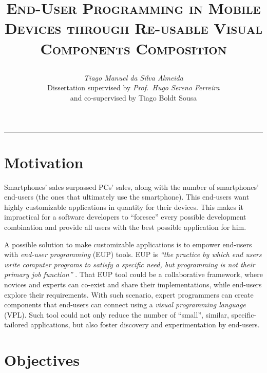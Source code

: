\documentclass[9pt,a4paper]{extarticle}
\begin{document}
\title{\vspace*{-8mm}\textbf{\textsc{End-User Programming in Mobile Devices
through Re-usable Visual Components Composition}}
\author{\emph{Tiago Manuel da Silva Almeida}\\[2mm]
\small{Dissertation supervised by \emph{Prof.\ Hugo Sereno Ferreira}}\\
\small{and co-supervised by Tiago Boldt Sousa}}}
\date{}
\maketitle
\thispagestyle{empty}

\vspace*{-4mm}\noindent\rule{\textwidth}{0.4pt}\vspace*{4mm}

\begin{multicols}{2}

\section{Motivation}\label{sec:motiva}

Smartphones' sales surpassed PCs' sales, along with the number of smartphones' end-users (the ones that ultimately use the smartphone). This end-users want highly customizable applications in quantity for their devices. 
This makes it impractical for a software developers to ``foresee'' every possible development combination and provide all users with the best possible application for him. 

A possible solution to make customizable applications is to empower end-users with \emph{end-user programming} (EUP) tools. 
EUP is \emph{``the practice by which end users write computer programs to satisfy a specific need, but programming is not their primary job function''} \cite{EUSEReport}.
That EUP tool could be a collaborative framework, where novices and experts can co-exist and share their implementations, while end-users explore their requirements. With such scenario, expert programmers can create components that end-users can connect using a \emph{visual programming language} (VPL). Such tool could not only reduce the number of ``small'', similar, specific-tailored applications, but also foster discovery and experimentation by end-users.

\section{Objectives}\label{sec:goals}


\end{multicols}
\end{document}
